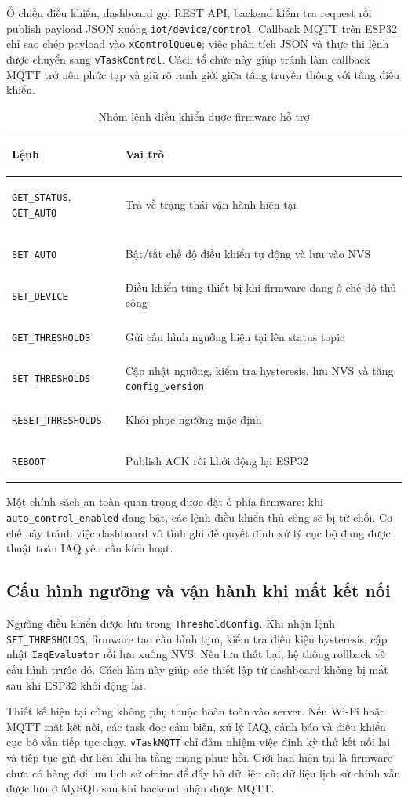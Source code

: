 Ở chiều điều khiển, dashboard gọi REST API, backend kiểm tra request rồi publish payload
JSON xuống \texttt{iot/device/control}. Callback MQTT trên ESP32 chỉ sao chép payload vào
\texttt{xControlQueue}; việc phân tích JSON và thực thi lệnh được chuyển sang
\texttt{vTaskControl}. Cách tổ chức này giúp tránh làm callback MQTT trở nên phức tạp và
giữ rõ ranh giới giữa tầng truyền thông với tầng điều khiển.

\begin{table}[!htbp]
    \centering
    \caption{Nhóm lệnh điều khiển được firmware hỗ trợ}
    \small
    \begin{tabularx}{\textwidth}{>{\bfseries\raggedright\arraybackslash}p{} >{\raggedright\arraybackslash}X}
        \toprule
        Lệnh & Vai trò \\
        \midrule
        \texttt{GET\_STATUS}, \texttt{GET\_AUTO} & Trả về trạng thái vận hành hiện tại \\
        \texttt{SET\_AUTO} & Bật/tắt chế độ điều khiển tự động và lưu vào NVS \\
        \texttt{SET\_DEVICE} & Điều khiển từng thiết bị khi firmware đang ở chế độ thủ công \\
        \texttt{GET\_THRESHOLDS} & Gửi cấu hình ngưỡng hiện tại lên status topic \\
        \texttt{SET\_THRESHOLDS} & Cập nhật ngưỡng, kiểm tra hysteresis, lưu NVS và tăng \texttt{config\_version} \\
        \texttt{RESET\_THRESHOLDS} & Khôi phục ngưỡng mặc định \\
        \texttt{REBOOT} & Publish ACK rồi khởi động lại ESP32 \\
        \bottomrule
    \end{tabularx}
\end{table}

Một chính sách an toàn quan trọng được đặt ở phía firmware: khi
\texttt{auto\_control\_enabled} đang bật, các lệnh điều khiển thủ công sẽ bị từ
chối. Cơ chế này tránh việc dashboard vô tình ghi đè quyết định xử lý cục bộ đang được
thuật toán IAQ yêu cầu kích hoạt.

\subsection{Cấu hình ngưỡng và vận hành khi mất kết nối}

Ngưỡng điều khiển được lưu trong \texttt{ThresholdConfig}. Khi nhận lệnh
\texttt{SET\_THRESHOLDS}, firmware tạo cấu hình tạm, kiểm tra điều kiện hysteresis, cập
nhật \texttt{IaqEvaluator} rồi lưu xuống NVS. Nếu lưu thất bại, hệ thống rollback về cấu
hình trước đó. Cách làm này giúp các thiết lập từ dashboard không bị mất sau khi ESP32
khởi động lại.

Thiết kế hiện tại cũng không phụ thuộc hoàn toàn vào server. Nếu Wi-Fi hoặc MQTT mất kết
nối, các task đọc cảm biến, xử lý IAQ, cảnh báo và điều khiển cục bộ vẫn tiếp tục chạy.
\texttt{vTaskMQTT} chỉ đảm nhiệm việc định kỳ thử kết nối lại và tiếp tục gửi dữ liệu khi hạ
tầng mạng phục hồi. Giới hạn hiện tại là firmware chưa có hàng đợi lưu lịch sử offline để
đẩy bù dữ liệu cũ; dữ liệu lịch sử chính vẫn được lưu ở MySQL sau khi backend nhận được
MQTT.
